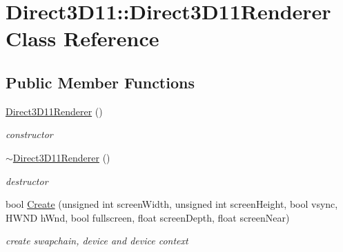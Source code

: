 \hypertarget{class_direct3_d11_1_1_direct3_d11_renderer}{}\section{Direct3\+D11\+:\+:Direct3\+D11\+Renderer Class Reference}
\label{class_direct3_d11_1_1_direct3_d11_renderer}
\subsection*{Public Member Functions}
\begin{DoxyCompactItemize}
\item 
\mbox{\label{class_direct3_d11_1_1_direct3_d11_renderer_a0c290e55a48545318e547bfeab9b73a5}} 
\mbox{\hyperlink{class_direct3_d11_1_1_direct3_d11_renderer_a0c290e55a48545318e547bfeab9b73a5}{Direct3\+D11\+Renderer}} ()
\begin{DoxyCompactList}\small\item\em constructor \end{DoxyCompactList}\item 
\mbox{\label{class_direct3_d11_1_1_direct3_d11_renderer_a31bd706c3e1309378b28ad06be636cb3}} 
\mbox{\hyperlink{class_direct3_d11_1_1_direct3_d11_renderer_a31bd706c3e1309378b28ad06be636cb3}{$\sim$\+Direct3\+D11\+Renderer}} ()
\begin{DoxyCompactList}\small\item\em destructor \end{DoxyCompactList}\item 
\mbox{\label{class_direct3_d11_1_1_direct3_d11_renderer_af9c0cf6d88c68028f66ebce59dd6a6d4}} 
bool \mbox{\hyperlink{class_direct3_d11_1_1_direct3_d11_renderer_af9c0cf6d88c68028f66ebce59dd6a6d4}{Create}} (unsigned int screen\+Width, unsigned int screen\+Height, bool vsync, H\+W\+ND h\+Wnd, bool fullscreen, float screen\+Depth, float screen\+Near)
\begin{DoxyCompactList}\small\item\em create swapchain, device and device context \end{DoxyCompactList}\item 
\mbox{\label{class_direct3_d11_1_1_direct3_d11_renderer_a5d5900d1f76c7bc18b3882d22d5804ef}} 

\end{DoxyCompactItemize}
